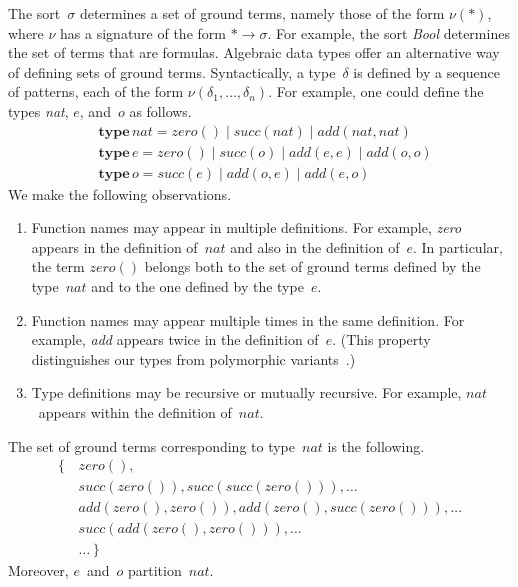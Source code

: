 \documentclass[preprint]{sigplanconf} %
\theoremstyle{remark}
\begin{document}
The sort~$\sigma$ determines a set of ground terms, namely those of the
form $\nu(*)$, where $\nu$ has a signature of the form $*\to\sigma$.  For
example, the sort \textit{Bool} determines the set of terms that are
formulas.  Algebraic data types offer an alternative way of defining sets
of ground terms. Syntactically, a type~$\delta$ is defined by a sequence of
patterns, each of the form $\nu(\delta_1,\ldots,\delta_n)$. For example,
one could define the types \textit{nat}, $e$, and~$o$ as follows.
\begin{align}
&\mathbf{type}\,\mathit{nat} =
      \mathit{zero}()
  \mid\mathit{succ}(\mathit{nat})
  \mid\mathit{add}(\mathit{nat},\mathit{nat}) \\
&\mathbf{type}\,e =
      \mathit{zero}()
  \mid\mathit{succ}(o)
  \mid\mathit{add}(e,e)
  \mid\mathit{add}(o,o) \\
&\mathbf{type}\,o =
      \mathit{succ}(e)
  \mid\mathit{add}(o,e)
  \mid\mathit{add}(e,o)
\end{align}
We make the following observations.
\begin{enumerate}
\item
  Function names may appear in multiple definitions. For example,
  \textit{zero} appears in the definition of~$\mathit{nat}$ and also in the
  definition of~$e$. In particular, the term $\mathit{zero}()$ belongs both
  to the set of ground terms defined by the type~$\mathit{nat}$ and to the
  one defined by the type~$e$.
\item
  Function names may appear multiple times in the same definition. For
  example, \textit{add} appears twice in the definition of~$e$. (This
  property distinguishes our types from polymorphic
  variants~\cite{garrigue1998}.)
\item
  Type definitions may be recursive or mutually recursive. For example,
  $\mathit{nat}$~appears within the definition of~$\mathit{nat}$.
\end{enumerate}
The set of ground terms corresponding to type~$\mathit{nat}$ is the following.
\begin{equation}
\begin{aligned}
\{\,&\mathit{zero}(), \\
    &\mathit{succ}(\mathit{zero}()),
        \mathit{succ}(\mathit{succ}(\mathit{zero}())), \ldots \\
    &\mathit{add}(\mathit{zero}(), \mathit{zero}()),
        \mathit{add}(\mathit{zero}(), \mathit{succ}(\mathit{zero}())),
        \ldots \\
    &\mathit{succ}(\mathit{add}(\mathit{zero}(), \mathit{zero}())),
        \ldots \\
    &\ldots\, \}
\end{aligned}
\end{equation}
Moreover, $e$~and~$o$ partition~$\mathit{nat}$.
\end{document}
